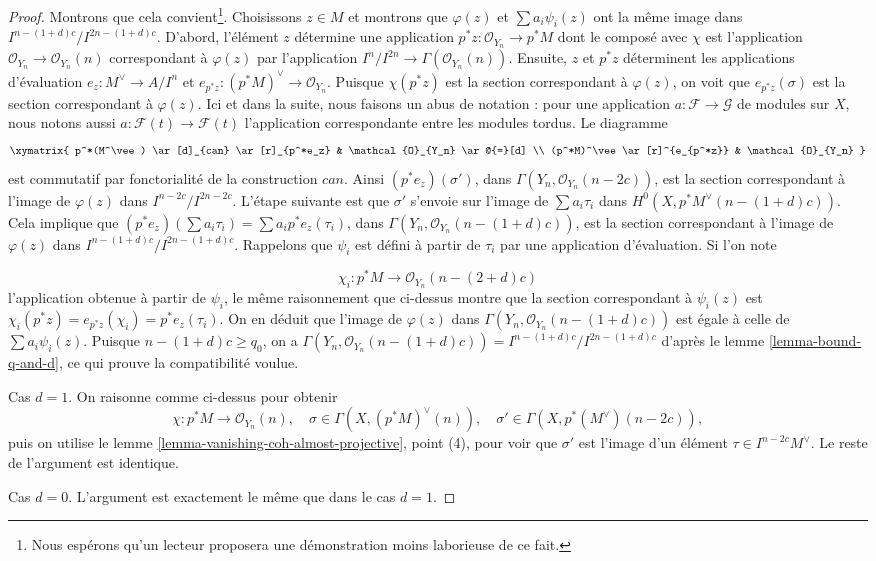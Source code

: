\begin{proof}
\medskip\noindent
Montrons que cela convient\footnote{Nous espérons qu'un lecteur proposera une démonstration moins laborieuse de ce fait.}. Choisissons $z \in M$ et montrons que $\varphi(z)$ et $\sum a_i \psi_i(z)$ ont la même image dans $I^{n - (1 + d)c}/I^{2n - (1 + d)c}$. D'abord, l'élément $z$ détermine une application $p^*z : \mathcal{O}_{Y_n} \to p^*M$ dont le composé avec $\chi$ est l'application $\mathcal{O}_{Y_n} \to \mathcal{O}_{Y_n}(n)$ correspondant à $\varphi(z)$ par l'application $I^n/I^{2n} \to \Gamma(\mathcal{O}_{Y_n}(n))$. Ensuite, $z$ et $p^*z$ déterminent les applications d'évaluation $e_z : M^\vee \to A/I^n$ et $e_{p^*z} : (p^*M)^\vee \to \mathcal{O}_{Y_n}$. Puisque $\chi(p^*z)$ est la section correspondant à $\varphi(z)$, on voit que $e_{p^*z}(\sigma)$ est la section correspondant à $\varphi(z)$. Ici et dans la suite, nous faisons un abus de notation : pour une application $a : \mathcal{F} \to \mathcal{G}$ de modules sur $X$, nous notons aussi $a : \mathcal{F}(t) \to \mathcal{F}(t)$ l'application correspondante entre les modules tordus. Le diagramme
$$
\xymatrix{
p^*(M^\vee) \ar[d]_{can} \ar[r]_{p^*e_z} & \mathcal{O}_{Y_n} \ar@{=}[d] \\
(p^*M)^\vee \ar[r]^{e_{p^*z}} & \mathcal{O}_{Y_n}
}
$$
est commutatif par fonctorialité de la construction $can$. Ainsi $(p^*e_z)(\sigma')$, dans $\Gamma(Y_n, \mathcal{O}_{Y_n}(n - 2c))$, est la section correspondant à l'image de $\varphi(z)$ dans $I^{n - 2c}/I^{2n - 2c}$. L'étape suivante est que $\sigma'$ s'envoie sur l'image de $\sum a_i \tau_i$ dans $H^0(X, p^*M^\vee(n - (1 + d)c))$. Cela implique que $(p^*e_z)(\sum a_i \tau_i) = \sum a_i p^*e_z(\tau_i)$, dans $\Gamma(Y_n, \mathcal{O}_{Y_n}(n - (1 + d)c))$, est la section correspondant à l'image de $\varphi(z)$ dans $I^{n - (1 + d)c}/I^{2n - (1 + d)c}$. Rappelons que $\psi_i$ est défini à partir de $\tau_i$ par une application d'évaluation. Si l'on note

$$
\chi_i : p^*M \longrightarrow \mathcal{O}_{Y_n}(n - (2 + d)c)
$$
l'application obtenue à partir de $\psi_i$, le même raisonnement que ci-dessus montre que la section correspondant à $\psi_i(z)$ est $\chi_i(p^*z) = e_{p^*z}(\chi_i) = p^*e_z(\tau_i)$. On en déduit que l'image de $\varphi(z)$ dans $\Gamma(Y_n, \mathcal{O}_{Y_n}(n - (1 + d)c))$ est égale à celle de $\sum a_i\psi_i(z)$. Puisque $n - (1 + d)c \geq q_0$, on a $\Gamma(Y_n, \mathcal{O}_{Y_n}(n - (1 + d)c)) =
I^{n - (1 + d)c}/I^{2n - (1 + d)c}$ d'après le lemme \ref{lemma-bound-q-and-d}, ce qui prouve la compatibilité voulue.

\medskip\noindent
Cas $d = 1$. On raisonne comme ci-dessus pour obtenir
$$
\chi : p^*M \longrightarrow \mathcal{O}_{Y_n}(n),\quad
\sigma \in \Gamma(X, (p^*M)^\vee(n)),\quad
\sigma' \in \Gamma(X, p^*(M^\vee)(n - 2c)),
$$
puis on utilise le lemme \ref{lemma-vanishing-coh-almost-projective}, point (4), pour voir que $\sigma'$ est l'image d'un élément $\tau \in I^{n - 2c}M^\vee$. Le reste de l'argument est identique.

\medskip\noindent
Cas $d = 0$. L'argument est exactement le même que dans le cas $d = 1$.
\end{proof}

